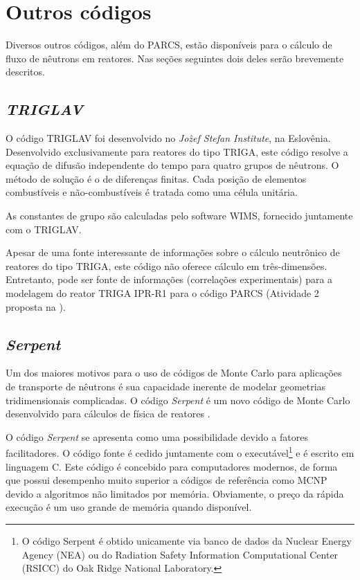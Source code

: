 \documentclass[12pt,openright,twoside,a4paper,english,french,spanish,brazil]{abntex2}
\begin{document}
\chapter{Outros códigos}
Diversos outros códigos, além do PARCS, estão disponíveis para o cálculo de fluxo de nêutrons 
em reatores. Nas seções seguintes dois deles serão brevemente descritos.

\section{\textit{TRIGLAV}}

O código TRIGLAV foi desenvolvido no \textit{Jo\^{z}ef Stefan Institute}, na Eslovênia. Desenvolvido 
exclusivamente para reatores do tipo TRIGA, este código resolve a equação de difusão independente 
do tempo para quatro grupos de nêutrons. O método de solução é o de diferenças finitas. Cada posição 
de elementos combustíveis e não-combustíveis é tratada como uma célula unitária. 

As constantes de grupo são calculadas pelo software WIMS, fornecido juntamente com o TRIGLAV.

Apesar de uma fonte interessante de informações sobre o cálculo neutrônico de reatores do 
tipo TRIGA, este código não oferece cálculo em três-dimensões. Entretanto, pode ser fonte 
de informações (correlações experimentais) para a modelagem do reator TRIGA IPR-R1 
para o código PARCS (Atividade 2 proposta na ).

\section{\textit{Serpent}}

Um dos maiores motivos para o uso de códigos de Monte Carlo para aplicações de transporte de 
nêutrons é sua capacidade inerente de modelar geometrias tridimensionais complicadas. O código 
\emph{Serpent} é um novo código de Monte Carlo desenvolvido para cálculos de física de 
reatores \cite{Leppanen2007}.

O código \emph{Serpent} se apresenta como uma possibilidade devido a fatores facilitadores. 
O código fonte é cedido juntamente com o executável\footnote{O código Serpent é obtido unicamente via banco de dados da Nuclear Energy Agency (NEA) ou 
do Radiation Safety Information Computational Center (RSICC) do Oak Ridge National Laboratory.}
e é escrito em linguagem C. Este código é concebido para computadores modernos, de forma que possui 
desempenho muito superior a códigos de referência como MCNP devido a algoritmos não limitados por 
memória. Obviamente, o preço da rápida execução é um uso grande de memória quando disponível. 
\end{document}
